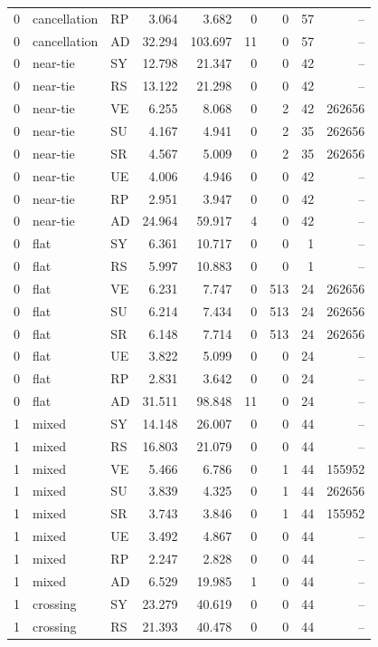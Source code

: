 \begin{longtable}{rllrrrrrr}
0 & cancellation & RP & 3.064 & 3.682 & 0 & 0 & 57 & -- \\
0 & cancellation & AD & 32.294 & 103.697 & 11 & 0 & 57 & -- \\
0 & near-tie & SY & 12.798 & 21.347 & 0 & 0 & 42 & -- \\
0 & near-tie & RS & 13.122 & 21.298 & 0 & 0 & 42 & -- \\
0 & near-tie & VE & 6.255 & 8.068 & 0 & 2 & 42 & 262656 \\
0 & near-tie & SU & 4.167 & 4.941 & 0 & 2 & 35 & 262656 \\
0 & near-tie & SR & 4.567 & 5.009 & 0 & 2 & 35 & 262656 \\
0 & near-tie & UE & 4.006 & 4.946 & 0 & 0 & 42 & -- \\
0 & near-tie & RP & 2.951 & 3.947 & 0 & 0 & 42 & -- \\
0 & near-tie & AD & 24.964 & 59.917 & 4 & 0 & 42 & -- \\
0 & flat & SY & 6.361 & 10.717 & 0 & 0 & 1 & -- \\
0 & flat & RS & 5.997 & 10.883 & 0 & 0 & 1 & -- \\
0 & flat & VE & 6.231 & 7.747 & 0 & 513 & 24 & 262656 \\
0 & flat & SU & 6.214 & 7.434 & 0 & 513 & 24 & 262656 \\
0 & flat & SR & 6.148 & 7.714 & 0 & 513 & 24 & 262656 \\
0 & flat & UE & 3.822 & 5.099 & 0 & 0 & 24 & -- \\
0 & flat & RP & 2.831 & 3.642 & 0 & 0 & 24 & -- \\
0 & flat & AD & 31.511 & 98.848 & 11 & 0 & 24 & -- \\
1 & mixed & SY & 14.148 & 26.007 & 0 & 0 & 44 & -- \\
1 & mixed & RS & 16.803 & 21.079 & 0 & 0 & 44 & -- \\
1 & mixed & VE & 5.466 & 6.786 & 0 & 1 & 44 & 155952 \\
1 & mixed & SU & 3.839 & 4.325 & 0 & 1 & 44 & 262656 \\
1 & mixed & SR & 3.743 & 3.846 & 0 & 1 & 44 & 155952 \\
1 & mixed & UE & 3.492 & 4.867 & 0 & 0 & 44 & -- \\
1 & mixed & RP & 2.247 & 2.828 & 0 & 0 & 44 & -- \\
1 & mixed & AD & 6.529 & 19.985 & 1 & 0 & 44 & -- \\
1 & crossing & SY & 23.279 & 40.619 & 0 & 0 & 44 & -- \\
1 & crossing & RS & 21.393 & 40.478 & 0 & 0 & 44 & -- \\

\end{longtable}
